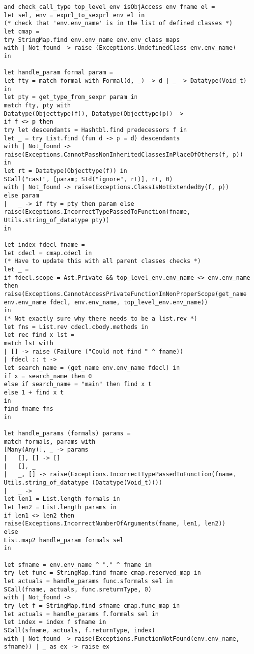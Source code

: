 \begin{verbatim}
and check_call_type top_level_env isObjAccess env fname el = 
let sel, env = exprl_to_sexprl env el in
(* check that 'env.env_name' is in the list of defined classes *)
let cmap = 
try StringMap.find env.env_name env.env_class_maps
with | Not_found -> raise (Exceptions.UndefinedClass env.env_name)
in

let handle_param formal param = 
let fty = match formal with Formal(d, _) -> d | _ -> Datatype(Void_t) in
let pty = get_type_from_sexpr param in
match fty, pty with 
Datatype(Objecttype(f)), Datatype(Objecttype(p)) -> 
if f <> p then
try let descendants = Hashtbl.find predecessors f in
let _ = try List.find (fun d -> p = d) descendants
with | Not_found -> raise(Exceptions.CannotPassNonInheritedClassesInPlaceOfOthers(f, p))
in
let rt = Datatype(Objecttype(f)) in
SCall("cast", [param; SId("ignore", rt)], rt, 0)
with | Not_found -> raise(Exceptions.ClassIsNotExtendedBy(f, p))
else param
|	_ -> if fty = pty then param else raise(Exceptions.IncorrectTypePassedToFunction(fname, Utils.string_of_datatype pty))
in

let index fdecl fname =
let cdecl = cmap.cdecl in
(* Have to update this with all parent classes checks *)
let _ = 
if fdecl.scope = Ast.Private && top_level_env.env_name <> env.env_name then
raise(Exceptions.CannotAccessPrivateFunctionInNonProperScope(get_name env.env_name fdecl, env.env_name, top_level_env.env_name))
in
(* Not exactly sure why there needs to be a list.rev *)
let fns = List.rev cdecl.cbody.methods in
let rec find x lst =
match lst with
| [] -> raise (Failure ("Could not find " ^ fname))
| fdecl :: t -> 
let search_name = (get_name env.env_name fdecl) in
if x = search_name then 0 
else if search_name = "main" then find x t 
else 1 + find x t
in
find fname fns
in

let handle_params (formals) params = 
match formals, params with 
[Many(Any)], _ -> params
| 	[], [] -> []
| 	[], _
| 	_, [] -> raise(Exceptions.IncorrectTypePassedToFunction(fname, Utils.string_of_datatype (Datatype(Void_t))))
| 	_ -> 
let len1 = List.length formals in
let len2 = List.length params in
if len1 <> len2 then raise(Exceptions.IncorrectNumberOfArguments(fname, len1, len2))
else
List.map2 handle_param formals sel
in

let sfname = env.env_name ^ "." ^ fname in
try let func = StringMap.find fname cmap.reserved_map in
let actuals = handle_params func.sformals sel in
SCall(fname, actuals, func.sreturnType, 0)
with | Not_found -> 
try let f = StringMap.find sfname cmap.func_map in
let actuals = handle_params f.formals sel in
let index = index f sfname in
SCall(sfname, actuals, f.returnType, index)
with | Not_found -> raise(Exceptions.FunctionNotFound(env.env_name, sfname)) | _ as ex -> raise ex


\end{verbatim}
